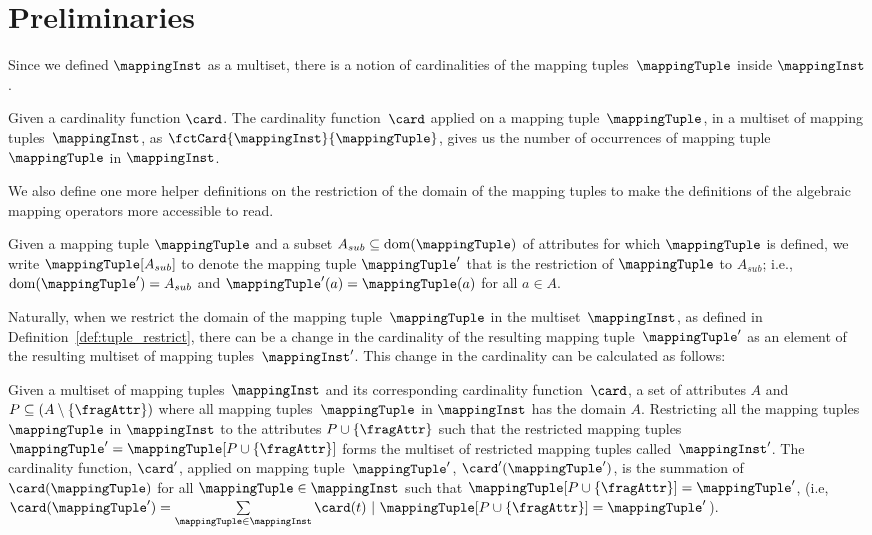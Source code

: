 \section{Preliminaries}%
\label{sec:preliminaries}
Since we defined $\mappingInst$ as a multiset, there is a
notion of cardinalities of the mapping tuples~$\mappingTuple$ inside
$\mappingInst$.


\begin{definition}
	\label{def:cardinality}
	Given a cardinality function $\card$.
	The cardinality function~$\card$ applied on a mapping
	tuple~$\mappingTuple$, in a multiset of mapping tuples~$\mappingInst$, as
	$\fctCard{\mappingInst}{\mappingTuple}$, gives us the number of occurrences
	of mapping tuple~$\mappingTuple$ in
	$\mappingInst$.
\end{definition}

We also define one more helper definitions on the restriction of the domain of
the mapping tuples to make the definitions of the algebraic mapping operators
more accessible to read.

\begin{definition}
	\label{def:tuple_restrict}
	Given a mapping tuple $\mappingTuple$ and a subset $A_{sub} \subseteq
		\mathrm{dom}(\mappingTuple)$ of attributes for which $\mappingTuple$ is
	defined, we write $\mappingTuple[A_{sub}]$ to denote the mapping tuple
	$\mappingTuple'$ that is the restriction of $\mappingTuple$ to $A_{sub}$;
	i.e., $\mathrm{dom}(\mappingTuple') = A_{sub}$ and $\mappingTuple'(a) =
		\mappingTuple(a)$ for all $a \in A$.
\end{definition}

Naturally, when we restrict the domain of the mapping tuple~$\mappingTuple$ in
the multiset~$\mappingInst$, as defined in Definition~\ref{def:tuple_restrict},
there can be a change in the cardinality of the resulting mapping
tuple~$\mappingTuple'$ as an element of the resulting multiset of mapping
tuples~$\mappingInst'$.
This change in the cardinality can be calculated as follows:

\begin{property}
	\label{prop:cardinality_restriction}
	Given a multiset of mapping tuples~$\mappingInst$ and its corresponding cardinality
	function~$\card$, a set of attributes $A$ and $P \subseteq (A
		\setminus \{\fragAttr\})$ where all mapping tuples~$\mappingTuple$ in
	$\mappingInst$ has the domain $A$.
	Restricting all the mapping tuples~$\mappingTuple$ in $\mappingInst$ to the
	attributes $P \cup \{\fragAttr\}$ such that the restricted mapping tuples
	$\mappingTuple' = \mappingTuple[P \cup \{\fragAttr\}]$ forms the multiset
	of restricted mapping tuples called~$\mappingInst'$.
    The cardinality function, $\card'$, applied on mapping
    tuple~$\mappingTuple'$, $\card'(\mappingTuple')$, is the summation of
    $\card(\mappingTuple)$ for all $\mappingTuple \in \mappingInst$ such that
    $\mappingTuple[P \cup \{\fragAttr\}]  = \mappingTuple'$, \break (i.e,
    $\card(\mappingTuple') = \sum\limits_{\mappingTuple \in \mappingInst}
    \card(t) \ | \ \mappingTuple[P \cup \{\fragAttr\}] = \mappingTuple'$). 
\end{property}

